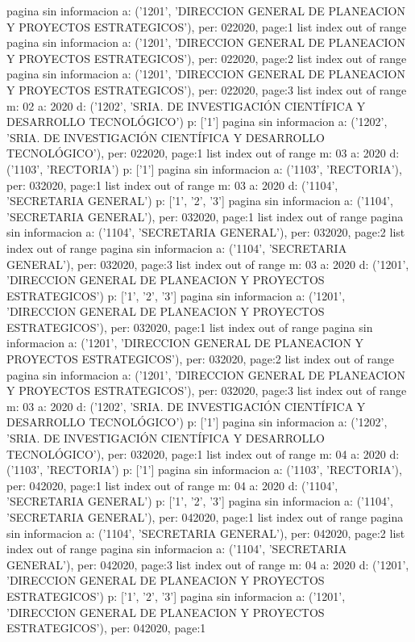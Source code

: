 \documentclass[11pt]{article}
\begin{document}
pagina sin informacion a: ('1201', 'DIRECCION GENERAL DE PLANEACION Y PROYECTOS ESTRATEGICOS'), per: 022020, page:1
list index out of range
pagina sin informacion a: ('1201', 'DIRECCION GENERAL DE PLANEACION Y PROYECTOS ESTRATEGICOS'), per: 022020, page:2
list index out of range
pagina sin informacion a: ('1201', 'DIRECCION GENERAL DE PLANEACION Y PROYECTOS ESTRATEGICOS'), per: 022020, page:3
list index out of range
m: 02 a: 2020 d: ('1202', 'SRIA. DE INVESTIGACIÓN CIENTÍFICA Y DESARROLLO TECNOLÓGICO') p: ['1']
pagina sin informacion a: ('1202', 'SRIA. DE INVESTIGACIÓN CIENTÍFICA Y DESARROLLO TECNOLÓGICO'), per: 022020, page:1
list index out of range
m: 03 a: 2020 d: ('1103', 'RECTORIA') p: ['1']
pagina sin informacion a: ('1103', 'RECTORIA'), per: 032020, page:1
list index out of range
m: 03 a: 2020 d: ('1104', 'SECRETARIA GENERAL') p: ['1', '2', '3']
pagina sin informacion a: ('1104', 'SECRETARIA GENERAL'), per: 032020, page:1
list index out of range
pagina sin informacion a: ('1104', 'SECRETARIA GENERAL'), per: 032020, page:2
list index out of range
pagina sin informacion a: ('1104', 'SECRETARIA GENERAL'), per: 032020, page:3
list index out of range
m: 03 a: 2020 d: ('1201', 'DIRECCION GENERAL DE PLANEACION Y PROYECTOS ESTRATEGICOS') p: ['1', '2', '3']
pagina sin informacion a: ('1201', 'DIRECCION GENERAL DE PLANEACION Y PROYECTOS ESTRATEGICOS'), per: 032020, page:1
list index out of range
pagina sin informacion a: ('1201', 'DIRECCION GENERAL DE PLANEACION Y PROYECTOS ESTRATEGICOS'), per: 032020, page:2
list index out of range
pagina sin informacion a: ('1201', 'DIRECCION GENERAL DE PLANEACION Y PROYECTOS ESTRATEGICOS'), per: 032020, page:3
list index out of range
m: 03 a: 2020 d: ('1202', 'SRIA. DE INVESTIGACIÓN CIENTÍFICA Y DESARROLLO TECNOLÓGICO') p: ['1']
pagina sin informacion a: ('1202', 'SRIA. DE INVESTIGACIÓN CIENTÍFICA Y DESARROLLO TECNOLÓGICO'), per: 032020, page:1
list index out of range
m: 04 a: 2020 d: ('1103', 'RECTORIA') p: ['1']
pagina sin informacion a: ('1103', 'RECTORIA'), per: 042020, page:1
list index out of range
m: 04 a: 2020 d: ('1104', 'SECRETARIA GENERAL') p: ['1', '2', '3']
pagina sin informacion a: ('1104', 'SECRETARIA GENERAL'), per: 042020, page:1
list index out of range
pagina sin informacion a: ('1104', 'SECRETARIA GENERAL'), per: 042020, page:2
list index out of range
pagina sin informacion a: ('1104', 'SECRETARIA GENERAL'), per: 042020, page:3
list index out of range
m: 04 a: 2020 d: ('1201', 'DIRECCION GENERAL DE PLANEACION Y PROYECTOS ESTRATEGICOS') p: ['1', '2', '3']
pagina sin informacion a: ('1201', 'DIRECCION GENERAL DE PLANEACION Y PROYECTOS ESTRATEGICOS'), per: 042020, page:1
\end{document}
